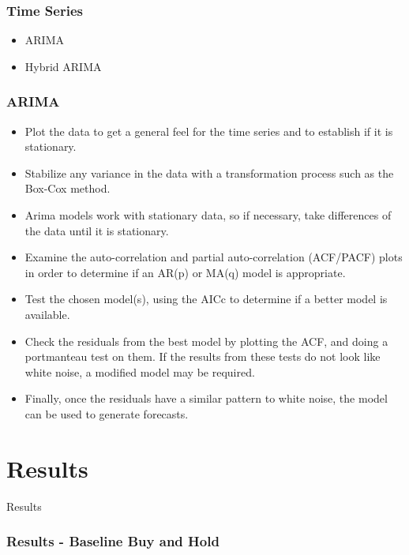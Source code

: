 \documentclass{beamer}
\begin{document}
\begin{frame}
\frametitle{Time Series}

\begin{itemize}
\item ARIMA
\item Hybrid ARIMA
\end{itemize}

\end{frame}

\begin{frame}
\frametitle{ARIMA}

\begin{itemize}
\item Plot the data to get a general feel for the time series and to establish if it is stationary.
\item Stabilize any variance in the data with a transformation process such as the Box-Cox method.
\item Arima models work with stationary data, so if necessary, take differences of the data until it is stationary.
\item Examine the auto-correlation and partial auto-correlation (ACF/PACF) plots in order to determine if an AR(p) or MA(q) model is appropriate.
\item Test the chosen model(s), using the AICc to determine if a better model is available.
\item Check the residuals from the best model by plotting the ACF, and doing a portmanteau test on them. If the results from these tests do not look like white noise, a modified model may be required.
\item Finally, once the residuals have a similar pattern to white noise, the model can be used to generate forecasts.
\end{itemize}

\end{frame}

\section{Results} %

\begin{frame}
\Huge{\centerline{Results}}
\end{frame}

\begin{frame}
\frametitle{Results - Baseline Buy and Hold}



\end{frame}
\end{document}
